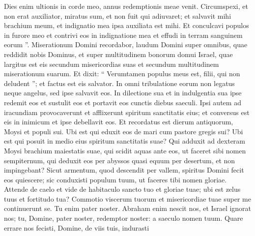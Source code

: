 \begin{biblechapter}
\begin{biblechapter}
\begin{biblechapter}
\begin{biblechapter}
\begin{biblechapter}
\begin{biblechapter}
\begin{biblechapter}
\begin{biblechapter}
\begin{biblechapter}
\begin{biblechapter}
\begin{biblechapter}
\begin{biblechapter}
\begin{biblechapter}
\begin{biblechapter}
\begin{biblechapter}
\begin{biblechapter}
\begin{biblechapter}
\begin{biblechapter}
\begin{biblechapter}
\begin{biblechapter}
\begin{biblechapter}
\begin{biblechapter}
\begin{biblechapter}
\begin{biblechapter}
\begin{biblechapter}
\begin{biblechapter}
\begin{biblechapter}
\begin{biblechapter}
\begin{biblechapter}
\begin{biblechapter}
\begin{biblechapter}
\begin{biblechapter}
\begin{biblechapter}
\begin{biblechapter}
\begin{biblechapter}
\begin{biblechapter}
\begin{biblechapter}
\begin{biblechapter}
\begin{biblechapter}
\begin{biblechapter}
\begin{biblechapter}
\begin{biblechapter}
\begin{biblechapter}
\begin{biblechapter}
\begin{biblechapter}
\begin{biblechapter}
\begin{biblechapter}
\begin{biblechapter}
\begin{biblechapter}
\begin{biblechapter}
\begin{biblechapter}
\begin{biblechapter}
\begin{biblechapter}
\begin{biblechapter}
\begin{biblechapter}
\begin{biblechapter}
\begin{biblechapter}
\begin{biblechapter}
\begin{biblechapter}
\begin{biblechapter}
\begin{biblechapter}
\begin{biblechapter}
\begin{biblechapter}
 \verse Dies enim ultionis in corde meo,
 annus redemptionis meae venit.
 \verse Circumspexi, et non erat auxiliator,
 miratus sum, et non fuit qui adiuvaret;
 et salvavit mihi brachium meum,
 et indignatio mea ipsa auxiliata est mihi.
 \verse Et conculcavi populos in furore meo
 et contrivi eos in indignatione mea
 et effudi in terram sanguinem eorum ”.
 \verse Miserationum Domini recordabor,
 laudum Domini
 super omnibus, quae reddidit nobis Dominus,
 et super multitudinem bonorum domui Israel,
 quae largitus est eis secundum misericordias suas
 et secundum multitudinem miserationum suarum.
 \verse Et dixit: “ Verumtamen populus meus est,
 filii, qui non deludent ”;
 et factus est eis salvator.
 \verse In omni tribulatione eorum non legatus neque angelus,
 sed ipse salvavit eos.
 In dilectione sua et in indulgentia sua
 ipse redemit eos
 et sustulit eos et portavit eos
 cunctis diebus saeculi.
 \verse Ipsi autem ad iracundiam provocaverunt
 et afflixerunt spiritum sanctitatis eius;
 et conversus est eis in inimicum
 et ipse debellavit eos.
 \verse Et recordatus est dierum antiquorum,
 Moysi et populi sui.
 Ubi est qui eduxit eos de mari
 cum pastore gregis sui?
 Ubi est qui posuit in medio eius
 spiritum sanctitatis suae?
 \verse Qui adduxit ad dexteram Moysi
 brachium maiestatis suae,
 qui scidit aquas ante eos,
 ut faceret sibi nomen sempiternum,
 \verse qui deduxit eos per abyssos
 quasi equum per desertum, et non impingebant?
 \verse Sicut armentum, quod descendit per vallem,
 spiritus Domini fecit eos quiescere;
 sic conduxisti populum tuum,
 ut faceres tibi nomen gloriae.
 \verse Attende de caelo et vide
 de habitaculo sancto tuo et gloriae tuae;
 ubi est zelus tuus et fortitudo tua?
 Commotio viscerum tuorum et misericordiae tuae
 super me continuerunt se.
 \verse Tu enim pater noster.
 Abraham enim nescit nos,
 et Israel ignorat nos;
 tu, Domine, pater noster,
 redemptor noster: a saeculo nomen tuum.
 \verse Quare errare nos fecisti, Domine, de viis tuis,
 indurasti 
\end{biblechapter}
\end{biblechapter}
\end{biblechapter}
\end{biblechapter}
\end{biblechapter}
\end{biblechapter}
\end{biblechapter}
\end{biblechapter}
\end{biblechapter}
\end{biblechapter}
\end{biblechapter}
\end{biblechapter}
\end{biblechapter}
\end{biblechapter}
\end{biblechapter}
\end{biblechapter}
\end{biblechapter}
\end{biblechapter}
\end{biblechapter}
\end{biblechapter}
\end{biblechapter}
\end{biblechapter}
\end{biblechapter}
\end{biblechapter}
\end{biblechapter}
\end{biblechapter}
\end{biblechapter}
\end{biblechapter}
\end{biblechapter}
\end{biblechapter}
\end{biblechapter}
\end{biblechapter}
\end{biblechapter}
\end{biblechapter}
\end{biblechapter}
\end{biblechapter}
\end{biblechapter}
\end{biblechapter}
\end{biblechapter}
\end{biblechapter}
\end{biblechapter}
\end{biblechapter}
\end{biblechapter}
\end{biblechapter}
\end{biblechapter}
\end{biblechapter}
\end{biblechapter}
\end{biblechapter}
\end{biblechapter}
\end{biblechapter}
\end{biblechapter}
\end{biblechapter}
\end{biblechapter}
\end{biblechapter}
\end{biblechapter}
\end{biblechapter}
\end{biblechapter}
\end{biblechapter}
\end{biblechapter}
\end{biblechapter}
\end{biblechapter}
\end{biblechapter}
\end{biblechapter}
